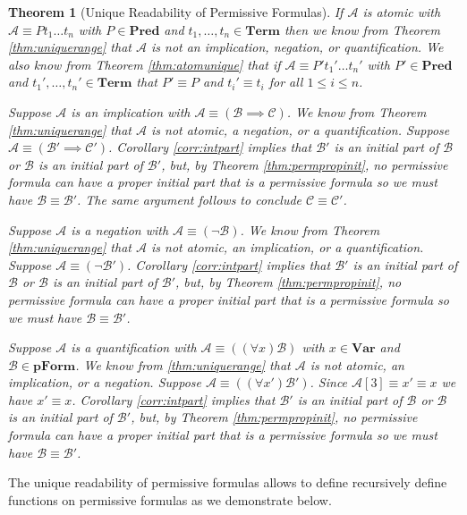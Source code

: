 \documentclass[12pt]{article}
\theoremstyle{break}
\theoremstyle{break}
\newtheorem{theorem}{Theorem}[section]
\theoremstyle{break}
\theoremstyle{break}
\theoremstyle{break}
\newtheorem{informal definition}[definition]{Informal Definition}
\newcommand{\mc}[1]{\mathcal{#1}}
\begin{document}
\begin{theorem}[Unique Readability of Permissive Formulas]
\label{thm:uniqueread}
If $\mc{A}$ is atomic with $\mc{A}\equiv Pt_1\ldots t_n$ with $P\in \textbf{Pred}$ and $t_1, \ldots, t_n \in \textbf{Term}$ then we know from Theorem \ref{thm:uniquerange} that $\mc{A}$ is not an implication, negation, or quantification.
We also know from Theorem \ref{thm:atomunique} that if $\mc{A} \equiv P't_1'\ldots t_n'$ with $P'\in\textbf{Pred}$ and $t_1',\ldots, t_n'\in\textbf{Term}$ that $P' \equiv P$ and $t_i' \equiv t_i$ for all $1 \le i \le n$.

Suppose $\mc{A}$ is an implication with $\mc{A} \equiv (\mc{B} \implies \mc{C})$.
We know from Theorem \ref{thm:uniquerange} that $\mc{A}$ is not atomic, a negation, or a quantification.
Suppose $\mc{A} \equiv (\mc{B}'\implies \mc{C}')$.
Corollary \ref{corr:intpart} implies that $\mc{B}'$ is an initial part of $\mc{B}$ or $\mc{B}$ is an initial part of $\mc{B}'$, but, by Theorem \ref{thm:permpropinit}, no permissive formula can have a proper initial part that is a permissive formula so we must have $\mc{B} \equiv \mc{B}'$.
The same argument follows to conclude $\mc{C} \equiv \mc{C}'$.

Suppose $\mc{A}$ is a negation with $\mc{A} \equiv (\lnot \mc{B})$.
We know from Theorem \ref{thm:uniquerange} that $\mc{A}$ is not atomic, an implication, or a quantification.
Suppose $\mc{A} \equiv (\lnot \mc{B}')$.
Corollary \ref{corr:intpart} implies that $\mc{B}'$ is an initial part of $\mc{B}$ or $\mc{B}$ is an initial part of $\mc{B}'$, but, by Theorem \ref{thm:permpropinit}, no permissive formula can have a proper initial part that is a permissive formula so we must have $\mc{B} \equiv \mc{B}'$.

Suppose $\mc{A}$ is a quantification with $\mc{A} \equiv ((\forall x) \mc{B})$ with $x \in \textbf{Var}$ and $\mc{B}\in\textbf{pForm}$.
We know from \ref{thm:uniquerange} that $\mc{A}$ is not atomic, an implication, or a negation.
Suppose $\mc{A} \equiv ((\forall x') \mc{B}')$.
Since $\mc{A}[3] \equiv x' \equiv x$ we have $x' \equiv x$.
Corollary \ref{corr:intpart} implies that $\mc{B}'$ is an initial part of $\mc{B}$ or $\mc{B}$ is an initial part of $\mc{B}'$, but, by Theorem \ref{thm:permpropinit}, no permissive formula can have a proper initial part that is a permissive formula so we must have $\mc{B} \equiv \mc{B}'$.
\end{theorem}

The unique readability of permissive formulas allows to define recursively define functions on permissive formulas as we demonstrate below.
\end{document}
